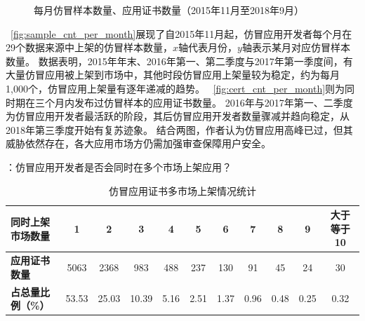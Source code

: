 \begin{figure}[t]
    \centering
    \hfill

    \hfill
    \caption{每月仿冒样本数量、应用证书数量（2015年11月至2018年9月）}
    \label{fig:fake_cnt_per_month}
\end{figure}

~\autoref{fig:sample_cnt_per_month}展现了自2015年11月起，仿冒应用开发者每个月在29个数据来源中上架的仿冒样本数量，$x$轴代表月份，$y$轴表示某月对应仿冒样本数量。
数据表明，2015年年末、2016年第一、第二季度与2017年第一季度间，有大量仿冒应用被上架到市场中，其他时段仿冒应用上架量较为稳定，约为每月1,000个，仿冒应用上架量有逐年递减的趋势。
~\autoref{fig:cert_cnt_per_month}则为同时期在三个月内发布过仿冒样本的应用证书数量。
2016年与2017年第一、二季度为仿冒应用开发者最活跃的阶段，其后仿冒应用开发者数量骤减并趋向稳定，从2018年第三季度开始有复苏迹象。
结合两图，作者认为仿冒应用高峰已过，但其威胁依然存在，各大应用市场方仍需加强审查保障用户安全。

：仿冒应用开发者是否会同时在多个市场上架应用？

\begin{table}[htbp]
    \renewcommand{\arraystretch}{1}
    \footnotesize
    \centering
    \caption{仿冒应用证书多市场上架情况统计}
    \vspace{1mm}
    \begin{tabular}{l cccccccccc}
        \toprule
        {\bf 同时上架市场数量} & 1     & 2     & 3     & 4    & 5    & 6    & 7    & 8    & 9    & 大于等于10 \\
        \midrule
        {\bf 应用证书数量}     & 5063  & 2368  & 983   & 488  & 237  & 130  & 91   & 45   & 24   & 30         \\
        {\bf 占总量比例（\%）} & 53.53 & 25.03 & 10.39 & 5.16 & 2.51 & 1.37 & 0.96 & 0.48 & 0.25 & 0.32       \\
        \bottomrule
    \end{tabular}
    \label{table:multi_market_statistic}
\end{table}

